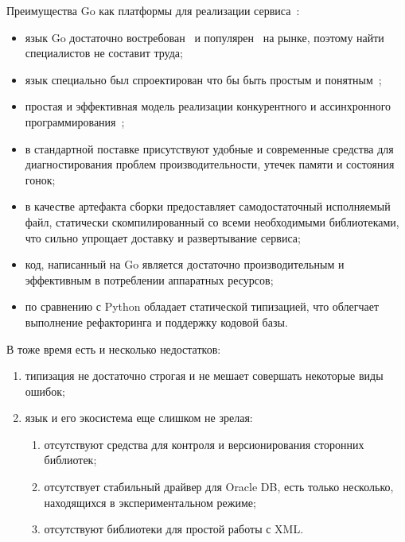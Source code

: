 Преимущества Go как платформы для реализации сервиса~\cite{}: %
\begin{itemize}
    \item язык Go достаточно востребован~\cite{} %
    и популярен~\cite{} %
    на рынке, поэтому найти специалистов не составит труда;
    \item язык специально был спроектирован что бы быть простым и понятным~\cite{}; %
    \item простая и эффективная модель реализации конкурентного и ассинхронного программирования~\cite{}; %
    \item в стандартной поставке присутствуют удобные и современные средства для диагностирования проблем производительности, %
    утечек памяти %
    и состояния гонок; %
    \item в качестве артефакта сборки предоставляет самодостаточный исполняемый файл,
    статически скомпилированный со всеми необходимыми библиотеками,
    что сильно упрощает доставку и развертывание сервиса;
    \item код, написанный на Go является достаточно производительным и эффективным в потреблении аппаратных ресурсов; %
    \item по сравнению с Python обладает статической типизацией, что облегчает выполнение рефакторинга и поддержку кодовой базы.
\end{itemize}

В тоже время есть и несколько недостатков:
\begin{enumerate}
    \item типизация не достаточно строгая и не мешает совершать некоторые виды ошибок; %
    \item язык и его экосистема еще слишком не зрелая: %
    \begin{enumerate}
        \item отсутствуют средства для контроля и версионирования сторонних библиотек;
        \item отсутствует стабильный драйвер для Oracle DB, есть только несколько, находящихся в экспериментальном режиме;
        \item отсутствуют библиотеки для простой работы с XML\@.
    \end{enumerate}
\end{enumerate}


